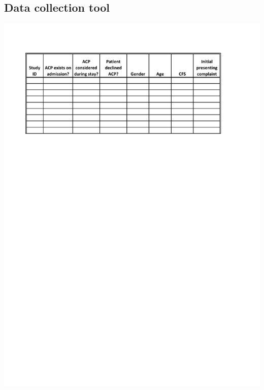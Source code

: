 \documentclass
[
	12pt,
	a4paper,
	oneside,
]{article}
\begin{document}
\begin{appendix}
\section{Data collection tool}
\label{appendix:tool}
\includegraphics[width=\textwidth]{dataCollection}
\end{appendix}
\end{document}
